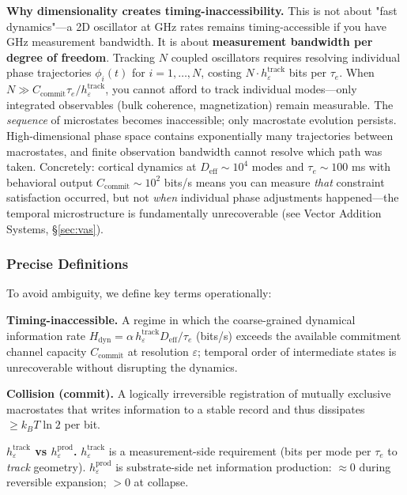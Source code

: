 \documentclass[12pt]{article}
\begin{document}
\textbf{Why dimensionality creates timing-inaccessibility.} This is not about "fast dynamics"—a 2D oscillator at GHz rates remains timing-accessible if you have GHz measurement bandwidth. It is about \textbf{measurement bandwidth per degree of freedom}. Tracking $N$ coupled oscillators requires resolving individual phase trajectories $\phi_i(t)$ for $i = 1,\ldots,N$, costing $N \cdot h_\varepsilon^{\text{track}}$ bits per $\tau_e$. When $N \gg C_{\text{commit}} \tau_e / h_\varepsilon^{\text{track}}$, you cannot afford to track individual modes—only integrated observables (bulk coherence, magnetization) remain measurable. The \textit{sequence} of microstates becomes inaccessible; only macrostate evolution persists. High-dimensional phase space contains exponentially many trajectories between macrostates, and finite observation bandwidth cannot resolve which path was taken. Concretely: cortical dynamics at $D_{\text{eff}} \sim 10^4$ modes and $\tau_e \sim 100$ ms with behavioral output $C_{\text{commit}} \sim 10^2$ bits/s means you can measure \textit{that} constraint satisfaction occurred, but not \textit{when} individual phase adjustments happened—the temporal microstructure is fundamentally unrecoverable (see Vector Addition Systems, \S\ref{sec:vas}).

\subsubsection{Precise Definitions}

To avoid ambiguity, we define key terms operationally:

\textbf{Timing-inaccessible.} A regime in which the coarse-grained dynamical information rate $H_{\text{dyn}}=\alpha\,h^{\text{track}}_\varepsilon D_{\text{eff}}/\tau_e$ (bits/s) exceeds the available commitment channel capacity $C_{\text{commit}}$ at resolution $\varepsilon$; temporal order of intermediate states is unrecoverable without disrupting the dynamics.

\textbf{Collision (commit).} A logically irreversible registration of mutually exclusive macrostates that writes information to a stable record and thus dissipates $\ge k_B T \ln 2$ per bit.

\textbf{$h^{\text{track}}_\varepsilon$ vs $h^{\text{prod}}_\varepsilon$.} $h^{\text{track}}_\varepsilon$ is a measurement-side requirement (bits per mode per $\tau_e$ to \emph{track} geometry). $h^{\text{prod}}_\varepsilon$ is substrate-side net information production: $\approx 0$ during reversible expansion; $>0$ at collapse.
\end{document}
